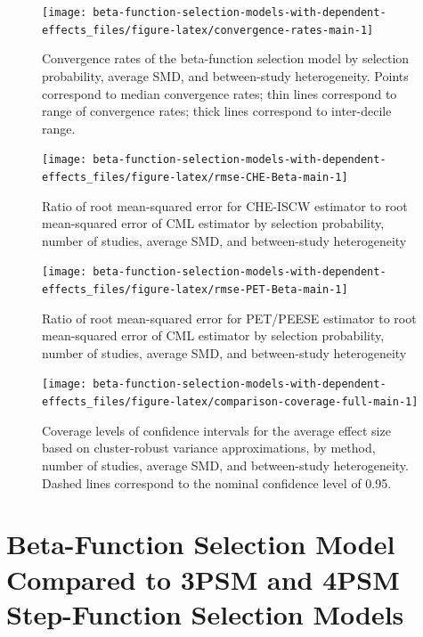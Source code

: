 \documentclass[
  american,
  man, donotrepeattitle,floatsintext]{apa7}
\begin{document}
\begin{figure}
\texttt{[image: beta-function-selection-models-with-dependent-effects\_files/figure-latex/convergence-rates-main-1]} \caption{Convergence rates of the beta-function selection model by selection probability, average SMD, and between-study heterogeneity. Points correspond to median convergence rates; thin lines correspond to range of convergence rates; thick lines correspond to inter-decile range.}\label{fig:convergence-rates-main}
\end{figure}

\begin{figure}
\texttt{[image: beta-function-selection-models-with-dependent-effects\_files/figure-latex/rmse-CHE-Beta-main-1]} \caption{Ratio of root mean-squared error for CHE-ISCW estimator to root mean-squared error of CML estimator by selection probability, number of studies, average SMD, and between-study heterogeneity}\label{fig:rmse-CHE-Beta-main}
\end{figure}

\begin{figure}
\texttt{[image: beta-function-selection-models-with-dependent-effects\_files/figure-latex/rmse-PET-Beta-main-1]} \caption{Ratio of root mean-squared error for PET/PEESE estimator to root mean-squared error of CML estimator by selection probability, number of studies, average SMD, and between-study heterogeneity}\label{fig:rmse-PET-Beta-main}
\end{figure}

\begin{figure}
\texttt{[image: beta-function-selection-models-with-dependent-effects\_files/figure-latex/comparison-coverage-full-main-1]} \caption{Coverage levels of confidence intervals for the average effect size based on cluster-robust variance approximations, by method, number of studies, average SMD, and between-study heterogeneity. Dashed lines correspond to the nominal confidence level of 0.95.}\label{fig:comparison-coverage-full-main}
\end{figure}

\section{Beta-Function Selection Model Compared to 3PSM and 4PSM Step-Function Selection Models}\label{beta-function-selection-model-compared-to-3psm-and-4psm-step-function-selection-models}
\end{document}
